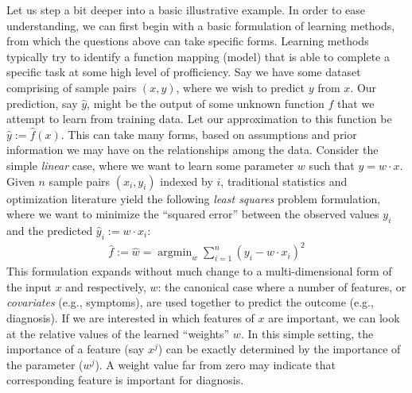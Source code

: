 
Let us step a bit deeper into a basic illustrative example. In order to ease understanding, we can first begin with a basic formulation of learning methods, from which the questions above can take specific forms. 
Learning methods typically  try to identify a function mapping (model) that is able to complete a specific task at some high level of profficiency.
Say we have some dataset comprising of sample pairs $(x,y)$, where we wish to predict $y$ from $x$.
Our prediction, say $\hat{y}$, might be the output of some unknown function $f$ that we attempt to learn from training data. 
Let our approximation to this function be $\hat{y}:=\hat{f}(x)$.
This can take many forms, 
based on assumptions and prior information we may have on the relationships among the data. 
Consider the simple \textit{linear} case,
where we want to learn some parameter $w$ such that $y = w\cdot x$. 
Given $n$ sample pairs $(x_i,y_i)$ indexed by $i$, traditional statistics and optimization literature yield the following \textit{least squares} problem formulation, where we want to minimize the ``squared error'' between the observed values $y_i$ and the predicted $\hat{y}_i:= w\cdot x_i$:
\begin{align}\label{eq:lq}
\hat{f}:=\hat{w} = \mathop{\arg\min}_{w} \sum_{i=1}^n (y_i - w\cdot x_i)^2
\end{align}
This formulation expands without much change to a multi-dimensional form of the input $x$ and respectively, $w$: the canonical case where a number of features, or \textit{covariates} (e.g., symptoms), are used together to predict the outcome (e.g., diagnosis). 
If we are interested in which features of $x$ are important, we can look at the relative values of the learned ``weights'' $w$. In this simple setting, the importance of a feature (say $x^j$) can be exactly determined by the importance of the parameter ($w^j$).
A weight value far from zero may indicate that corresponding feature is important for diagnosis.

